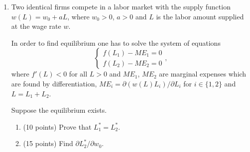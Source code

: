 \documentclass[12pt]{article} %
\theoremstyle{definition} %
\begin{document}
\begin{enumerate}[resume]
  \item Two identical firms compete in a labor market with the supply function $w(L)= w_0 + aL$, 
  where $w_0>0$, $a>0$ and $L$ is the labor amount supplied at the wage rate $w$.
  
  In order to find equilibrium one has to solve the system of equations
  \[
  \begin{cases}
    f(L_1) - ME_1 = 0 \\
    f(L_2) - ME_2 = 0
  \end{cases},
  \]
  where $f'(L)<0$ for all $L>0$ 
  and $ME_1$, $ME_2$ are marginal expenses which are found by differentiation, 
  $ME_i = \partial (w(L)L_i)/\partial L_i$ for $i \in \{1, 2\}$ and $L = L_1 + L_2$. 
  
  Suppose the equilibrium exists.
  \begin{enumerate}
    \item (10 points) Prove that $L_1^*=L_2^*$.
    \item (15 points) Find $\partial L_2^*/\partial w_0$.
  \end{enumerate}
  
  \end{enumerate}
  





\newpage
{}
\end{document}
